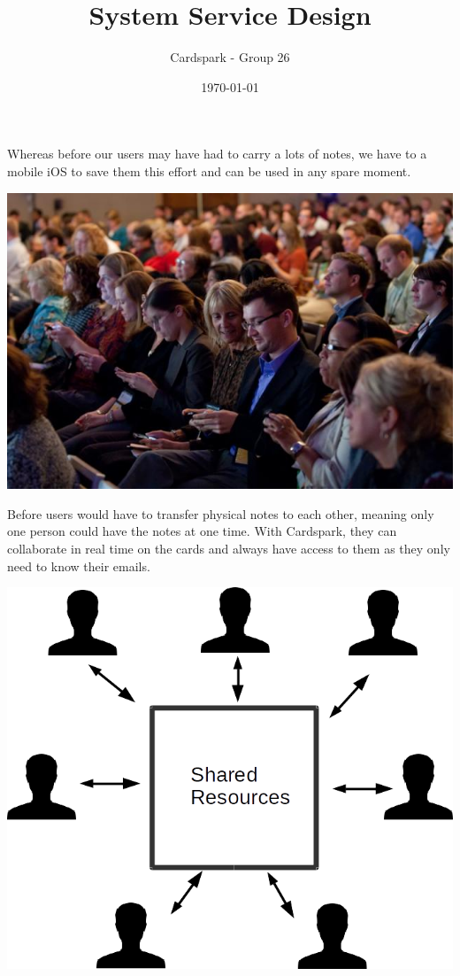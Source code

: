 \documentclass{article}
\begin{document}
\title{System Service Design}
\author{Cardspark - Group 26}
\date{\today}
\maketitle  

Whereas before our users may have had to carry a lots of notes, we have to a mobile iOS to save them this effort and can be used in any spare moment.

\begin{center}
	\vspace{1mm}
	\includegraphics[scale=0.35]{public.jpg}
	\vspace{1mm}
\end{center}

Before users would have to transfer physical notes to each other, meaning only one person could have the notes at one time.  With Cardspark, they can collaborate in real time on the cards and always have access to them as they only need to know their emails.

\begin{center}
	\vspace{1mm}
	\includegraphics[scale=0.35]{shared.png}
	\vspace{1mm}
\end{center}
\end{document}
